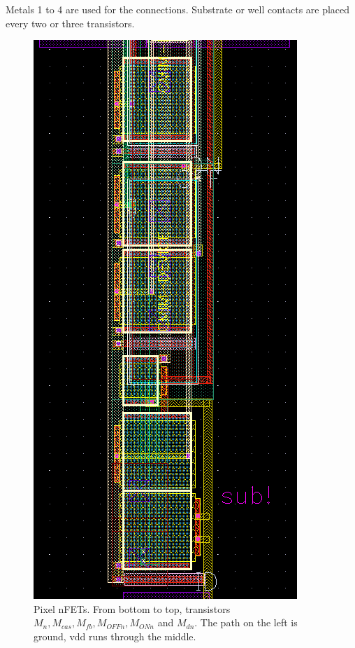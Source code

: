 Metals 1 to 4 are used for the connections. 
Substrate or well contacts are placed every two or three transistors. 

\begin{figure}
    \center
    \includegraphics{pixel1.png}
    \caption{Pixel nFETs. From bottom to top, transistors $M_n, M_{cas}, M_{fb}, M_{OFFn}, M_{ONn}$ and $M_{dn}$. The path on the left is ground, vdd runs through the middle.}
    \label{fig:layout-1}
\end{figure}


